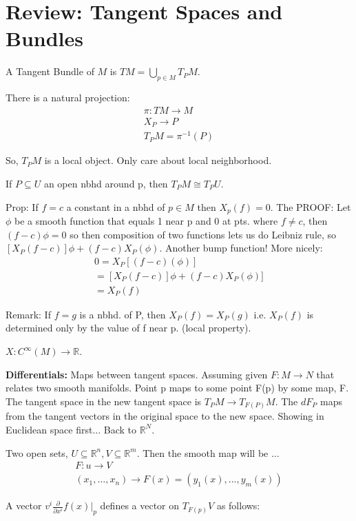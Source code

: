 \documentclass[12pt,letterpaper]{article}
\begin{document}
\section{Review: Tangent Spaces and Bundles}
A Tangent Bundle of $M$ is $TM = \bigcup_{p \in M} T_P M$. 

There is a natural projection:
\begin{align}
    \pi : TM \rightarrow M \\
    X_P \rightarrow P \\
    T_P M = \pi^{-1}(P)
\end{align}

So, $T_PM$ is a local object. Only care about local neighborhood.

If $P \subseteq U$ an open nbhd around p, then $T_P M \cong T_P U$.

Prop: If $f=c$ a constant in a nbhd of $p \in M$ then $X_p(f)=0$. The PROOF: Let $\phi$ be a smooth function that equals 1 near p and 0 at pts. where $f\neq c$, then $(f-c)\phi = 0 $ so then composition of two functions lets us do Leibniz rule, so $[X_P(f-c)]\phi + (f-c) X_P(\phi)$. Another bump function! More nicely:
\begin{align}
    0 = X_P[(f-c)(\phi)] \\
    = [X_P(f-c)]\phi + (f-c) X_P(\phi)] \\
    = X_P(f)
\end{align}

Remark: If $f=g$ is a nbhd. of P, then $X_P(f) = X_P(g)$ i.e. $X_P(f)$ is determined only by the value of f near p. (local property).

$X: C^{\infty}(M) \rightarrow \mathbb{R}$.

\textbf{Differentials:} Maps between tangent spaces. Assuming given $F: M \rightarrow N$ that relates two smooth manifolds. Point p maps to some point F(p) by some map, F. The tangent space in the new tangent space is $T_PM \rightarrow T_{F(P)}M$. The $dF_P$ maps from the tangent vectors in the original space to the new space. Showing in Euclidean space first... Back to $\mathbb{R}^N$.

Two open sets, $U \subseteq \mathbb{R}^n, V \subseteq \mathbb{R}^m$. Then the smooth map will be ...
\begin{align}
    F: u \rightarrow V \\
    (x_1, \dots, x_n) \rightarrow F(x) = (y_1(x), \dots, y_m(x))
\end{align}

A vector $v^i \frac{\partial}{\partial x^i} f(x) \big|_p$ defines a vector on $T_{F(p)}V$ as follows:
\end{document}
